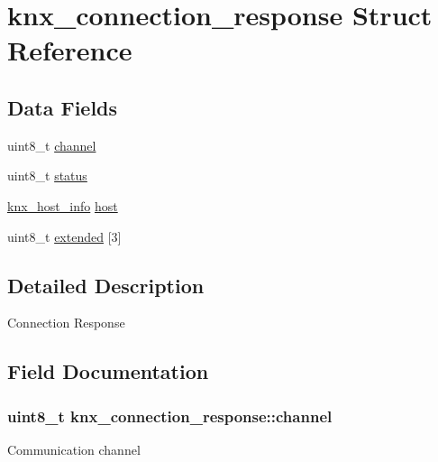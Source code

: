 \hypertarget{structknx__connection__response}{}\section{knx\+\_\+connection\+\_\+response Struct Reference}
\label{structknx__connection__response}
\subsection*{Data Fields}
\begin{DoxyCompactItemize}
\item 
uint8\+\_\+t \hyperlink{structknx__connection__response_a24b4df768dec317c6cdbfc9152f5dae4}{channel}
\item 
uint8\+\_\+t \hyperlink{structknx__connection__response_a5a7287455bcf54fa0d5accf44e4f227a}{status}
\item 
\hyperlink{structknx__host__info}{knx\+\_\+host\+\_\+info} \hyperlink{structknx__connection__response_aaad9c38a8731b4950e529c797f175fb7}{host}
\item 
uint8\+\_\+t \hyperlink{structknx__connection__response_a72e1af6c689193991c7f1a5a36bfdcf7}{extended} \mbox{[}3\mbox{]}
\end{DoxyCompactItemize}


\subsection{Detailed Description}
Connection Response 

\subsection{Field Documentation}
\subsubsection[{\texorpdfstring{channel}{channel}}]{\setlength{\rightskip}{0pt plus 5cm}uint8\+\_\+t knx\+\_\+connection\+\_\+response\+::channel}\hypertarget{structknx__connection__response_a24b4df768dec317c6cdbfc9152f5dae4}{}\label{structknx__connection__response_a24b4df768dec317c6cdbfc9152f5dae4}
Communication channel 
